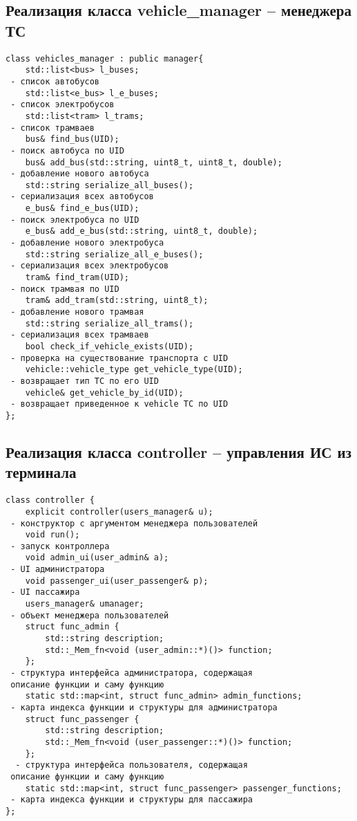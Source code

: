\subsection{Реализация класса vehicle\_manager -- менеджера ТС}
\begin{verbatim}
class vehicles_manager : public manager{
	std::list<bus> l_buses;
 - список автобусов
	std::list<e_bus> l_e_buses;
 - список электробусов
	std::list<tram> l_trams;
 - список трамваев
	bus& find_bus(UID);
 - поиск автобуса по UID
	bus& add_bus(std::string, uint8_t, uint8_t, double);
 - добавление нового автобуса
	std::string serialize_all_buses();
 - сериализация всех автобусов
	e_bus& find_e_bus(UID);
 - поиск электробуса по UID
	e_bus& add_e_bus(std::string, uint8_t, double);
 - добавление нового электробуса
	std::string serialize_all_e_buses();
 - сериализация всех электробусов
	tram& find_tram(UID);
 - поиск трамвая по UID
	tram& add_tram(std::string, uint8_t);
 - добавление нового трамвая
	std::string serialize_all_trams();
 - сериализация всех трамваев
	bool check_if_vehicle_exists(UID);
 - проверка на существование транспорта с UID
	vehicle::vehicle_type get_vehicle_type(UID);
 - возвращает тип ТС по его UID
	vehicle& get_vehicle_by_id(UID);
 - возвращает приведенное к vehicle ТС по UID 
};
\end{verbatim}

\subsection{Реализация класса controller -- управления ИС из терминала}
\begin{verbatim}
class controller {
	explicit controller(users_manager& u);
 - конструктор с аргументом менеджера пользователей
	void run();
 - запуск контроллера
	void admin_ui(user_admin& a);
 - UI администратора
	void passenger_ui(user_passenger& p);
 - UI пассажира
	users_manager& umanager;
 - объект менеджера пользователей
	struct func_admin {
		std::string description;
		std::_Mem_fn<void (user_admin::*)()> function;
	};
 - структура интерфейса администратора, содержащая 
 описание функции и саму функцию
	static std::map<int, struct func_admin> admin_functions;
 - карта индекса функции и структуры для администратора
	struct func_passenger {
		std::string description;
		std::_Mem_fn<void (user_passenger::*)()> function;
	};
  - структура интерфейса пользователя, содержащая 
 описание функции и саму функцию
	static std::map<int, struct func_passenger> passenger_functions;
 - карта индекса функции и структуры для пассажира
};
\end{verbatim}


